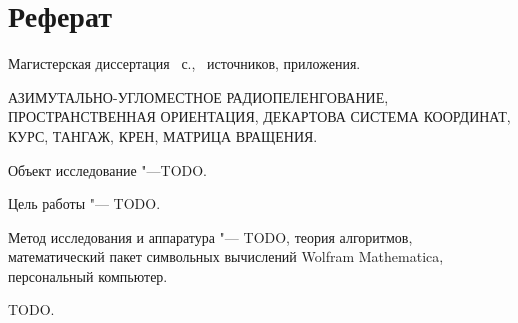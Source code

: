 \documentclass[../main.tex]{subfiles}
\begin{document}
\newpage
\section*{\centering Реферат}

\par\noindent Магистерская диссертация ~с., \ источников,  приложения.\\
\vspace{0.5cm}

\par\noindent АЗИМУТАЛЬНО-УГЛОМЕСТНОЕ РАДИОПЕЛЕНГОВАНИЕ, ПРОСТРАНСТВЕННАЯ ОРИЕНТАЦИЯ, ДЕКАРТОВА СИСТЕМА КООРДИНАТ, КУРС, ТАНГАЖ, КРЕН, МАТРИЦА ВРАЩЕНИЯ. \\

\par\noindent Объект исследование "---TODO.\\
\par\noindent Цель работы "--- TODO.\\
\par\noindent Метод исследования и аппаратура "--- TODO, теория алгоритмов, математический пакет символьных вычислений {\ttfamily Wolfram Mathematica}, персональный компьютер.\\

\par\noindent TODO.

\clearpage
\normalsize
\end{document}
